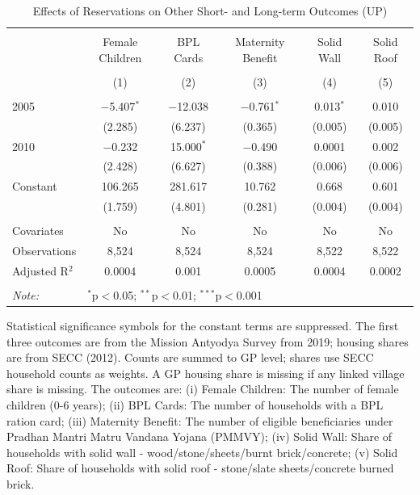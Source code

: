 \begin{table}[!htbp]
\centering
\begin{threeparttable}

  \caption{Effects of Reservations on Other Short- and Long-term Outcomes (UP)} 
  \label{up_shrug_other_05_10} 
\scriptsize 
\begin{tabular}{@{\extracolsep{0pt}}lccccc} 
\\[-1.8ex]\hline 
\hline \\[-1.8ex] 
 & Female Children & BPL Cards & Maternity Benefit & Solid Wall & Solid Roof \\ 
\\[-1.8ex] & (1) & (2) & (3) & (4) & (5)\\ 
\hline \\[-1.8ex] 
 2005 & $-$5.407$^{*}$ & $-$12.038 & $-$0.761$^{*}$ & 0.013$^{*}$ & 0.010 \\ 
  & (2.285) & (6.237) & (0.365) & (0.005) & (0.005) \\ 
  2010 & $-$0.232 & 15.000$^{*}$ & $-$0.490 & 0.0001 & 0.002 \\ 
  & (2.428) & (6.627) & (0.388) & (0.006) & (0.006) \\ 
  Constant & 106.265 & 281.617 & 10.762 & 0.668 & 0.601 \\ 
  & (1.759) & (4.801) & (0.281) & (0.004) & (0.004) \\ 
 \hline \\[-1.8ex] 
Covariates & No & No & No & No & No \\ 
Observations & 8,524 & 8,524 & 8,524 & 8,522 & 8,522 \\ 
Adjusted R$^{2}$ & 0.0004 & 0.001 & 0.0005 & 0.0004 & 0.0002 \\ 
\hline 
\hline \\[-1.8ex] 
\textit{Note:}  & \multicolumn{5}{l}{$^{*}$p$<$0.05; $^{**}$p$<$0.01; $^{***}$p$<$0.001} \\ 
\end{tabular} 
\begin{tablenotes}[flushleft]
\scriptsize
\item[] Statistical significance symbols for the constant terms are suppressed. The first three outcomes are from the Mission Antyodya Survey from
    2019; housing shares are from SECC (2012). Counts are summed to GP
    level; shares use SECC household counts as weights. A GP housing
    share is missing if any linked village share is missing. The outcomes
    are: (i) Female Children: The number of female children (0-6 years);
    (ii) BPL Cards: The number of households with a BPL ration card;
    (iii) Maternity Benefit: The number of eligible beneficiaries under
    Pradhan Mantri Matru Vandana Yojana (PMMVY); (iv) Solid Wall: Share
    of households with solid wall - wood/stone/sheets/burnt
    brick/concrete; (v) Solid Roof: Share of households with solid roof -
    stone/slate sheets/concrete burned brick.
\end{tablenotes}
\end{threeparttable}
\end{table}
